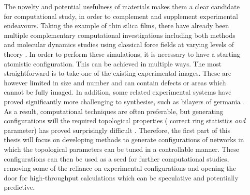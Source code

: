 The novelty and potential usefulness of \td{} materials makes them a  clear candidate for computational study, in order to complement and supplement experimental endeavours. 
Taking the example of thin silica films, there have already been multiple complementary computational investigations including both \abinitio{} methods and molecular dynamics studies using classical force fields at varying levels of theory \cite{Bjorkman2013,Malashevich2016,Wilson2013,Wilson2018,Zhang2018a,Bamer2019,Roy2019,Richter2019}.
In order to perform these simulations, it is necessary to have a starting atomistic configuration.
This can be achieved in multiple ways. 
The most straightforward is to take one of the existing experimental images. 
These are however limited in size and number and can contain defects or areas which cannot be fully imaged.
In addition, some related experimental systems have proved significantly more challenging to synthesise, such as bilayers of germania \cite{Lewandowski2018,Lewandowski2019}.
As a result, computational techniques are often preferable, but generating configurations will the required topological properties (\ie{} correct ring statistics \textit{and} \aw{} parameter) has proved surprisingly difficult \cite{Roy2018,Kumar2014}.
Therefore, the first part of this thesis will focus on developing methods to generate configurations of \td{} networks in which the topological parameters can be tuned in a controllable manner.
These configurations can then be used as a seed for further computational studies, removing some of the reliance on experimental configurations and opening the door for high\--throughput calculations which can be speculative and potentially predictive.

